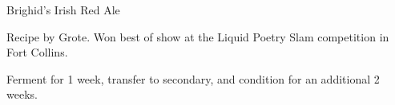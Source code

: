 \documentclass[parskip=half,fontsize=9pt,oneside]{scrbook}
\begin{document}
\mainmatter


\begin{recipe}{Brighid's Irish Red Ale}

\begin{aboutblock}
Recipe by Grote. Won best of show at the Liquid Poetry Slam competition in
Fort Collins.  
\end{aboutblock}


\begin{methodandtiming}

\begin{directions}
Ferment for 1 week, transfer to secondary, and condition for an additional 2 weeks.
\end{directions}

\end{methodandtiming}

\recipebreak

\begin{ingredientsblock}

\begin{malts}
\end{malts}

\begin{hops}
\end{hops}


\end{ingredientsblock}

\end{recipe}


\end{document}
